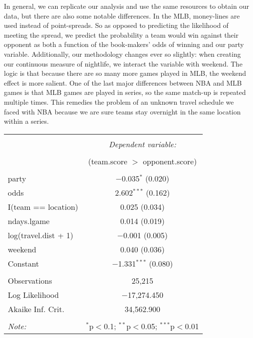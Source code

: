 \documentclass[letterpaper,12pt]{article}
\begin{document}
In general, we can replicate our analysis and use the same resources to obtain our data,
 but there are also some notable differences.
In the MLB, money-lines
are used instead of point-spreads. So as opposed to predicting
the likelihood of meeting the spread, we predict the probability
a team would win against their opponent as both a function of the book-makers'
odds of winning and our party variable. 
Additionally, our methodology changes ever so slightly: when creating our
continuous measure of nightlife, we interact the variable with weekend. The logic
is that because there are so many more games played in MLB, the weekend effect is more salient.
One of the last major differences between NBA and MLB games is that MLB games
are played in series, so the same match-up is repeated multiple times. This remedies
the problem of an unknown travel schedule we faced with NBA because we are sure 
teams stay overnight in the same location within a series.

\begin{tabular}{@{\extracolsep{5pt}}lc}  \\[-1.8ex]\hline  \hline \\[-1.8ex]   & \multicolumn{1}{c}{\textit{Dependent variable:}} \\  \cline{2-2}  \\[-1.8ex] & (team.score $ > $ opponent.score) \\  \hline \\[-1.8ex]   party & $-$0.035$^{*}$ (0.020) \\    odds & 2.602$^{***}$ (0.162) \\    I(team == location) & 0.025 (0.034) \\    ndays.lgame & 0.014 (0.019) \\    log(travel.dist + 1) & $-$0.001 (0.005) \\    weekend & 0.040 (0.036) \\    Constant & $-$1.331$^{***}$ (0.080) \\   \hline \\[-1.8ex]  Observations & 25,215 \\  Log Likelihood & $-$17,274.450 \\  Akaike Inf. Crit. & 34,562.900 \\  \hline  \hline \\[-1.8ex]  \textit{Note:}  & \multicolumn{1}{r}{$^{*}$p$<$0.1; $^{**}$p$<$0.05; $^{***}$p$<$0.01} \\  \end{tabular} 
\end{document}

